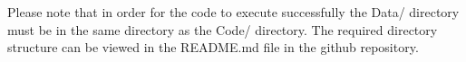 \documentclass[11pt]{article}
\begin{document}
    \noindent Please note that in order for the code to execute successfully the Data/ directory must be in the same directory as the Code/ directory. The required directory structure can be viewed in the README.md file in the github repository.

    \newpage
    
    
\end{document}
